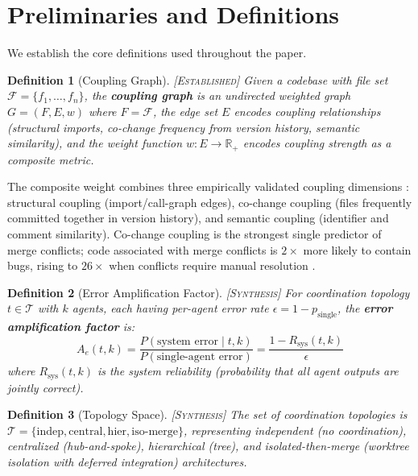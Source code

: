 \documentclass[11pt, a4paper, logo, copyright]{googledeepmind}
\newtheorem{definition}{Definition}[section]
\newcommand{\established}{\textsc{[Established]}}
\newcommand{\synthesis}{\textsc{[Synthesis]}}
\begin{document}
\section{Preliminaries and Definitions}
\label{sec:prelim}

We establish the core definitions used throughout the paper.

\begin{definition}[Coupling Graph] \established{}
\label{def:coupling-graph}
Given a codebase with file set $\mathcal{F} = \{f_1, \ldots, f_n\}$, the \textbf{coupling graph} is an undirected weighted graph $G = (F, E, w)$ where $F = \mathcal{F}$, the edge set $E$ encodes coupling relationships (structural imports, co-change frequency from version history, semantic similarity), and the weight function $w: E \to \mathbb{R}_+$ encodes coupling strength as a composite metric.
\end{definition}

The composite weight combines three empirically validated coupling dimensions \citep{Martin1994, KasiSarma2013, Accioly2018}: structural coupling (import/call-graph edges), co-change coupling (files frequently committed together in version history), and semantic coupling (identifier and comment similarity).
Co-change coupling is the strongest single predictor of merge conflicts; code associated with merge conflicts is $2\times$ more likely to contain bugs, rising to $26\times$ when conflicts require manual resolution \citep{Accioly2018}.

\begin{definition}[Error Amplification Factor] \synthesis{}
\label{def:error-amp}
For coordination topology $t \in \mathcal{T}$ with $k$ agents, each having per-agent error rate $\epsilon = 1 - p_{\mathrm{single}}$, the \textbf{error amplification factor} is:
\begin{equation}
  A_e(t, k) = \frac{P(\text{system error} \mid t, k)}{P(\text{single-agent error})} = \frac{1 - R_{\mathrm{sys}}(t, k)}{\epsilon}
\end{equation}
where $R_{\mathrm{sys}}(t, k)$ is the system reliability (probability that all agent outputs are jointly correct).
\end{definition}

\begin{definition}[Topology Space] \synthesis{}
\label{def:topology}
The set of coordination topologies is $\mathcal{T} = \{\mathrm{indep}, \mathrm{central}, \mathrm{hier}, \mathrm{iso\text{-}merge}\}$, representing independent (no coordination), centralized (hub-and-spoke), hierarchical (tree), and isolated-then-merge (worktree isolation with deferred integration) architectures.
\end{definition}
\end{document}
